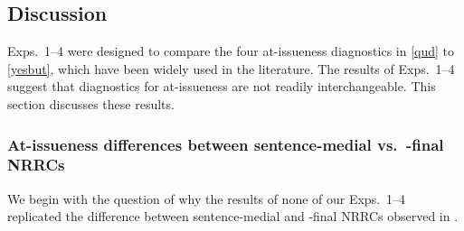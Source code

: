 \documentclass[times,linguex]{glossa}
\begin{document}
\subsection{Discussion}\label{sec:discussion1}

Exps.~1--4 were designed to compare the four at-issueness diagnostics in \ref{qud} to \ref{yesbut}, which have been widely used in the literature. The results of Exps.~1--4 suggest that diagnostics for at-issueness are not readily interchangeable. This section discusses these results. %

%  
%  
%  


\subsubsection{At-issueness differences between sentence-medial vs.~-final NRRCs} \label{ssub:s}

We begin with the question of why the results of none of our Exps.~1--4 replicated the difference between sentence-medial and -final NRRCs observed in \citealt[Exp.~2]{syrett_experimental_2015}. %
\end{document}
